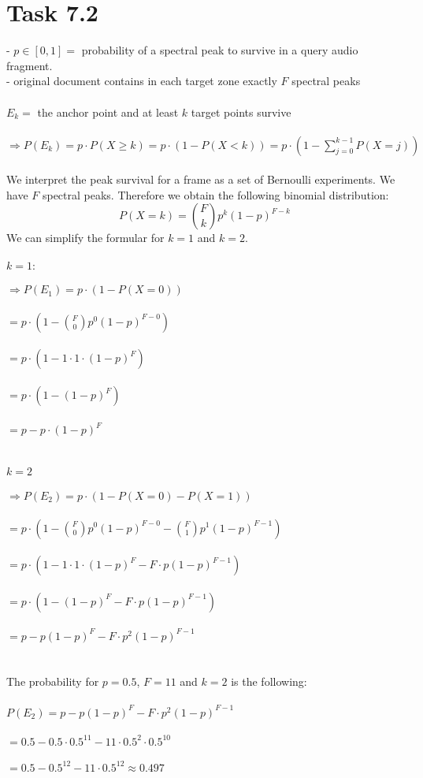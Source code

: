 \documentclass[12pt]{article}
\begin{document}
\section*{Task 7.2}
- $p \in [0,1] =$ probability of a spectral peak to survive in a query audio fragment.\\
- original document contains in each target zone exactly $F$ spectral peaks\\\\
$E_{k} =$ the anchor point and at least $k$ target points survive\\\\
$\Rightarrow P(E_{k}) = p \cdot P(X \geq k) = p \cdot (1-P(X < k)) = p \cdot (1 - \sum_{j=0}^{k-1} P(X = j))$\\\\
We interpret the peak survival for a frame as a set of Bernoulli experiments. We have $F$ spectral peaks. Therefore we obtain the following binomial distribution:\\
\[
P(X = k) = \binom{F}{k}p^{k}(1-p)^{F-k}
\]
We can simplify the formular for $k=1$ and $k=2$.\\\\
$k=1:$\\\\
$\Rightarrow P(E_{1}) = p \cdot (1 - P(X=0))$\\\\
$= p \cdot (1 - \binom{F}{0}p^{0}(1-p)^{F-0})$\\\\
$= p \cdot (1 - 1 \cdot 1 \cdot (1-p)^{F})$\\\\
$= p \cdot (1-(1-p)^{F})$\\\\
$= p-p \cdot (1-p)^{F}$\\\\\\
$k=2$\\\\
$\Rightarrow P(E_{2}) = p \cdot (1-P(X=0) - P(X=1))$\\\\
$= p \cdot (1 - \binom{F}{0}p^{0}(1-p)^{F-0}-\binom{F}{1}p^{1}(1-p)^{F-1})$\\\\
$= p \cdot (1 - 1 \cdot 1 \cdot (1-p)^{F} - F \cdot p(1-p)^{F-1})$\\\\
$= p \cdot (1 - (1 - p)^{F} - F \cdot p(1-p)^{F-1})$\\\\
$= p - p(1-p)^{F} - F \cdot p^{2}(1-p)^{F-1}$\\\\\\
The probability for $p = 0.5$, $F = 11$ and $k = 2$ is the following:\\\\
$P(E_{2}) = p - p(1-p)^{F} - F \cdot p^{2}(1-p)^{F-1}$\\\\
$= 0.5 - 0.5 \cdot 0.5^{11} - 11 \cdot 0.5^{2} \cdot 0.5^{10}$\\\\
$= 0.5 - 0.5^{12} - 11 \cdot 0.5^{12} \approx 0.497$
\end{document}
